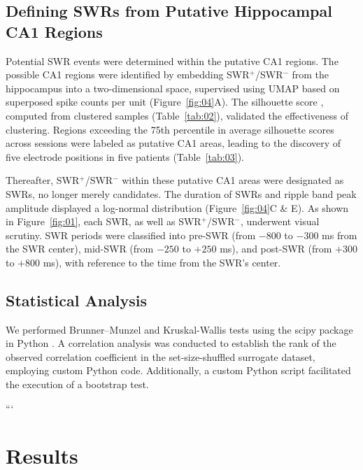 \documentclass[final,3p,times,twocolumn]{elsarticle}
\begin{document}
\subsection{Defining SWRs from Putative Hippocampal CA1 Regions}
Potential SWR events were determined within the putative CA1 regions. The possible CA1 regions were identified by embedding SWR$^+$/SWR$^-$ from the hippocampus into a two-dimensional space, supervised using UMAP based on superposed spike counts per unit \cite{mcinnes_umap_2018} (Figure~\ref{fig:04}A). The silhouette score \cite{rousseeuw_silhouettes_1987}, computed from clustered samples (Table~\ref{tab:02}), validated the effectiveness of clustering. Regions exceeding the 75th percentile in average silhouette scores across sessions were labeled as putative CA1 areas, leading to the discovery of five electrode positions in five patients (Table~\ref{tab:03}). 

Thereafter, SWR$^+$/SWR$^-$ within these putative CA1 areas were designated as SWRs, no longer merely candidates. The duration of SWRs and ripple band peak amplitude displayed a log-normal distribution (Figure~\ref{fig:04}C \& E). As shown in Figure~\ref{fig:01}, each SWR, as well as SWR$^+$/SWR$^-$, underwent visual scrutiny. SWR periods were classified into pre-SWR (from $-800$ to $-300$ ms from the SWR center), mid-SWR (from $-250$ to $+250$ ms), and post-SWR (from $+300$ to $+800$ ms), with reference to the time from the SWR's center.

\subsection{Statistical Analysis}
We performed Brunner--Munzel and Kruskal-Wallis tests using the scipy package in Python \cite{virtanen_scipy_2020}. A correlation analysis was conducted to establish the rank of the observed correlation coefficient in the set-size-shuffled surrogate dataset, employing custom Python code. Additionally, a custom Python script facilitated the execution of a bootstrap test.

\label{sec:methods}
```
\section{Results}
\end{document}
